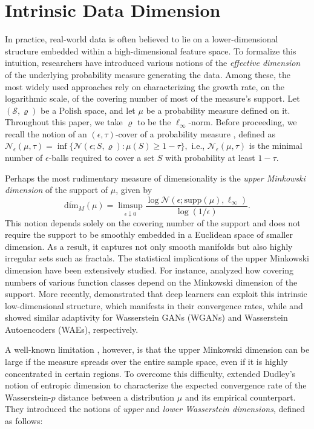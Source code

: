 \documentclass[12pts]{article}
\newcommand{\cN}{ \mathcal{N}}
\newcommand{\cS}{ \mathcal{S}}
\newcommand{\sN}{ \mathscr{N}}
\begin{document}
\section{Intrinsic Data Dimension}
\label{intrinsic}
In practice, real-world data is often believed to lie on a lower-dimensional structure embedded within a high-dimensional feature space. To formalize this intuition, researchers have introduced various notions of the \emph{effective dimension} of the underlying probability measure generating the data. Among these, the most widely used approaches rely on characterizing the growth rate, on the logarithmic scale, of the covering number of most of the measure's support.   Let $(\cS, \varrho)$ be a Polish space, and let $\mu$ be a probability measure defined on it. Throughout this paper, we take $\varrho$ to be the $\ell_\infty$-norm. Before proceeding, we recall the notion of an $(\epsilon, \tau)$-cover of a probability measure \citep{posner1967epsilon}, defined as  
\( \sN_\epsilon(\mu, \tau) = \inf\{ \cN(\epsilon; S, \varrho) : \mu(S) \ge 1 - \tau \}, \)  
i.e., $\sN_\epsilon(\mu, \tau)$ is the minimal number of $\epsilon$-balls required to cover a set $S$ with probability at least $1-\tau$.  

Perhaps the most rudimentary measure of dimensionality is the \emph{upper Minkowski dimension} of the support of $\mu$, given by  
\[
\overline{\text{dim}}_M(\mu) = \limsup_{\epsilon \downarrow 0} \frac{\log \cN(\epsilon; \text{supp}(\mu), \ell_\infty)}{\log(1/\epsilon)}.
\]  
This notion depends solely on the covering number of the support and does not require the support to be smoothly embedded in a Euclidean space of smaller dimension. As a result, it captures not only smooth manifolds but also highly irregular sets such as fractals.  The statistical implications of the upper Minkowski dimension have been extensively studied. For instance, \citet{kolmogorov1961} analyzed how covering numbers of various function classes depend on the Minkowski dimension of the support. More recently, \citet{JMLR:v21:20-002} demonstrated that deep learners can exploit this intrinsic low-dimensional structure, which manifests in their convergence rates, while \citet{JMLR:v23:21-0732} and \cite{chakraborty2024a} showed similar adaptivity for Wasserstein GANs (WGANs) and Wasserstein Autoencoders (WAEs), respectively.  

A well-known limitation \citep{JMLR:v26:24-0054}, however, is that the upper Minkowski dimension can be large if the measure spreads over the entire sample space, even if it is highly concentrated in certain regions.  To overcome this difficulty, \citet{weed2019sharp} extended Dudley's \citep{dudley1969speed} notion of entropic dimension to characterize the expected convergence rate of the Wasserstein-$p$ distance between a distribution $\mu$ and its empirical counterpart. They introduced the notions of \emph{upper} and \emph{lower Wasserstein dimensions}, defined as follows:
\end{document}
